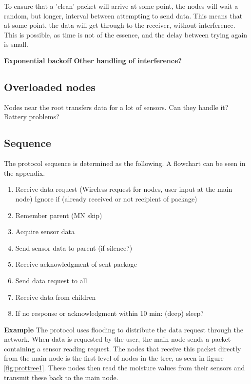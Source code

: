 To ensure that a 'clean' packet will arrive at some point, the nodes will wait a random, but longer, interval between attempting to send data. This means that at some point, the data will get through to the receiver, without interference.
This is possible, as time is not of the essence, and the delay between trying again is small.

\textbf{Exponential backoff}\newline
\textbf{Other handling of interference?}

\subsection{Overloaded nodes}
Nodes near the root transfers data for a lot of sensors. Can they handle it? Battery problems?

\subsection{Sequence}
The protocol sequence is determined as the following. A flowchart can be seen in the appendix.
\begin{enumerate}
	\item Receive data request (Wireless request for nodes, user input at the main node)
		\subitem Ignore if (already received or not recipient of package)
	\item Remember parent (MN skip)
	\item Acquire sensor data
	\item Send sensor data to parent (if silence?)
	\item Receive acknowledgment of sent package
	\item Send data request to all
	\item Receive data from children
	\item If no response or acknowledgment within 10 min: (deep) sleep?
\end{enumerate}



\textbf{Example}\newline
The protocol uses flooding to distribute the data request through the network. 
When data is requested by the user, the main node sends a packet containing a sensor reading request. 
The nodes that receive this packet directly from the main node is the first level of nodes in the tree, as seen in figure \ref{fig:prottree1}. 
These nodes then read the moisture values from their sensors and transmit these back to the main node. 

